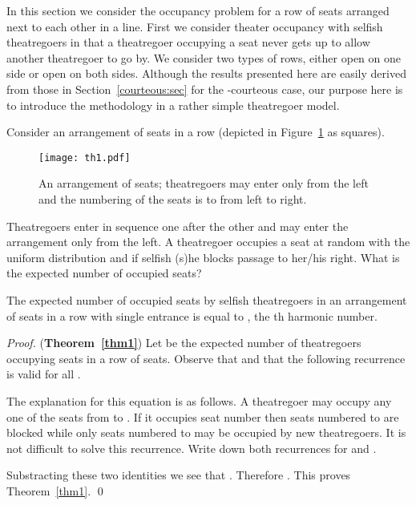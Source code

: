 \documentclass[11pt]{llncs}
\begin{document}
In this section we consider the occupancy problem for a row of seats
arranged next to each other in a line.
First we consider theater occupancy with
selfish theatregoers in that a theatregoer occupying a
seat never gets up to allow another theatregoer to go by.
We consider two types of rows, either
open on one side or open on both sides.
Although the results presented here are easily derived from those 
in Section~\ref{courteous:sec} for the -courteous case,
our purpose here is to introduce the methodology in
a rather simple theatregoer model.



Consider an arrangement of  seats in a row
(depicted in Figure~\ref{fig:th1} as squares).
\begin{figure}[!htb]
\begin{center}
\texttt{[image: th1.pdf]}\end{center}
\caption{An arrangement of seats; theatregoers may enter only from the left
and the numbering of the seats is  to  from left to right.}
\label{fig:th1}
\end{figure}
Theatregoers enter in sequence one after 
the other and may enter the arrangement only from the left.
A theatregoer occupies a seat at random with the uniform distribution
and if selfish (s)he
blocks passage 
to her/his right. What is the expected number 
of occupied seats?



\begin{theorem}
\label{thm1}
The expected number of occupied seats by selfish theatregoers
in an arrangement of  seats
in a row with single entrance is equal to , the th harmonic number.
\end{theorem}
\begin{proof} ({\bf Theorem~\ref{thm1}})
Let  be the expected number of theatregoers occupying seats 
in a row of  seats.
Observe that  and that the following recurrence is valid
for all .

The explanation for this equation is as follows. A theatregoer
may occupy any one of the seats from  to . If it
occupies seat number  then seats numbered  to 
are blocked while only seats numbered  to  may be
occupied by new theatregoers. 
It is not difficult to solve this recurrence. Write down
both recurrences for  and .

Substracting these two identities we see that
.
Therefore .
This proves Theorem~\ref{thm1}.
\qed
\end{proof}
\end{document}
